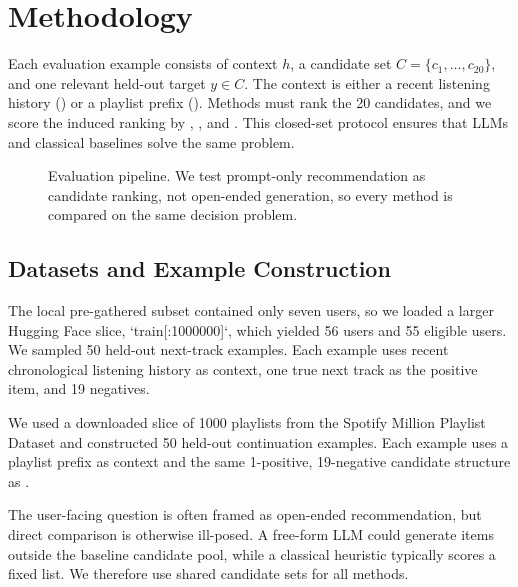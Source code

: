 \section{Methodology}
\label{sec:method}

 Each evaluation example consists of context $h$, a candidate set $C=\{c_1,\dots,c_{20}\}$, and one relevant held-out target $y \in C$. The context is either a recent listening history (\lastfm) or a playlist prefix (\mpd). Methods must rank the 20 candidates, and we score the induced ranking by \mrr, \ndcg, and \hitten. This closed-set protocol ensures that LLMs and classical baselines solve the same problem.

\begin{figure}[t]
    \centering
    \caption{Evaluation pipeline. We test prompt-only recommendation as candidate ranking, not open-ended generation, so every method is compared on the same decision problem.}
    \label{fig:pipeline}
\end{figure}

\subsection{Datasets and Example Construction}

 The local pre-gathered subset contained only seven users, so we loaded a larger Hugging Face slice, `train[:1000000]`, which yielded 56 users and 55 eligible users. We sampled 50 held-out next-track examples. Each example uses recent chronological listening history as context, one true next track as the positive item, and 19 negatives.

 We used a downloaded slice of 1000 playlists from the Spotify Million Playlist Dataset and constructed 50 held-out continuation examples. Each example uses a playlist prefix as context and the same 1-positive, 19-negative candidate structure as \lastfm.

 The user-facing question is often framed as open-ended recommendation, but direct comparison is otherwise ill-posed. A free-form LLM could generate items outside the baseline candidate pool, while a classical heuristic typically scores a fixed list. We therefore use shared candidate sets for all methods.

